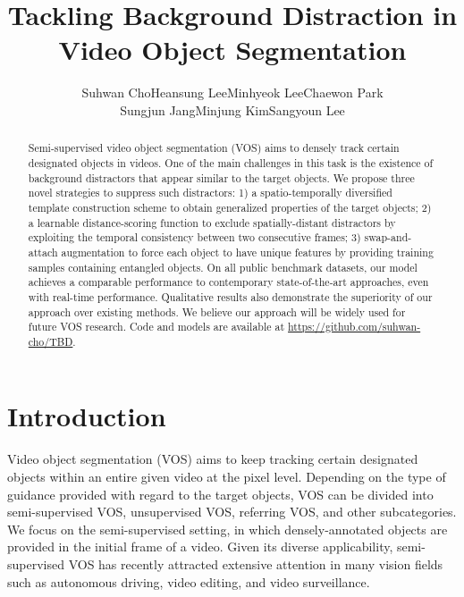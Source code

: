 \documentclass[runningheads]{llncs}
\begin{document}
\pagestyle{headings}
\mainmatter
\def\ECCVSubNumber{4697}  

\title{Tackling Background Distraction in\\Video Object Segmentation} 





\author{Suhwan Cho\quad Heansung Lee\quad Minhyeok Lee\quad Chaewon Park\\Sungjun Jang\quad Minjung Kim\quad Sangyoun Lee}
\maketitle



\begin{abstract}
Semi-supervised video object segmentation (VOS) aims to densely track certain designated objects in videos. One of the main challenges in this task is the existence of background distractors that appear similar to the target objects. We propose three novel strategies to suppress such distractors: 1) a spatio-temporally diversified template construction scheme to obtain generalized properties of the target objects; 2) a learnable distance-scoring function to exclude spatially-distant distractors by exploiting the temporal consistency between two consecutive frames; 3) swap-and-attach augmentation to force each object to have unique features by providing training samples containing entangled objects. On all public benchmark datasets, our model achieves a comparable performance to contemporary state-of-the-art approaches, even with real-time performance. Qualitative results also demonstrate the superiority of our approach over existing methods. We believe our approach will be widely used for future VOS research. Code and models are available at \url{https://github.com/suhwan-cho/TBD}.

\end{abstract}


\section{Introduction}
Video object segmentation (VOS) aims to keep tracking certain designated objects within an entire given video at the pixel level. Depending on the type of guidance provided with regard to the target objects, VOS can be divided into semi-supervised VOS, unsupervised VOS, referring VOS, and other subcategories. We focus on the semi-supervised setting, in which densely-annotated objects are provided in the initial frame of a video. Given its diverse applicability, semi-supervised VOS has recently attracted extensive attention in many vision fields such as autonomous driving, video editing, and video surveillance.
\end{document}
